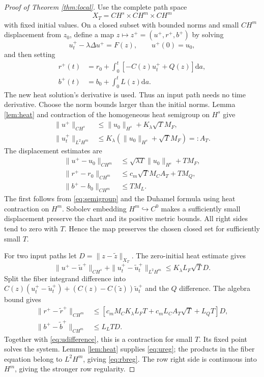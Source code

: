 \documentclass[11pt]{article}
\newcommand{\dd}{\mathrm d}
\begin{document}
\begin{proof}[Proof of Theorem \ref{thm:local}]
Use the complete path space
\begin{equation}
 X_T=CH^s\times CH^m\times CH^m
\end{equation}
with fixed initial values. On a closed subset with bounded norms and small $CH^m$ displacement from $z_0$, define a map $z\mapsto z^+=(u^+,r^+,b^+)$ by solving
\begin{equation}
 u_t^+-\lambda\Delta u^+=F(z),\qquad u^+(0)=u_0,
\end{equation}
and then setting
\begin{align}
 r^+(t)&=r_0+\int_0^t[-C(z)u_t^++Q(z)]\dd a,\\
 b^+(t)&=b_0+\int_0^tL(z)\dd a.
 \label{eq:picard}
\end{align}
The new heat solution's derivative is used. Thus an input path needs no time derivative. Choose the norm bounds larger than the initial norms. Lemma \ref{lem:heat} and contraction of the homogeneous heat semigroup on $H^s$ give
\begin{align}
 \|u^+\|_{CH^s}&\leq\|u_0\|_{H^s}+K_\lambda\sqrt T M_F,\\
 \|u_t^+\|_{L^2H^m}&\leq
 K_\lambda(\|u_0\|_{H^s}+\sqrt T M_F)=:A_T.
 \label{eq:A}
\end{align}
The displacement estimates are
\begin{align}
 \|u^+-u_0\|_{CH^m}&\leq
           \sqrt{\lambda T}\|u_0\|_{H^s}+TM_F,\label{eq:preserve-u}\\
 \|r^+-r_0\|_{CH^m}&\leq c_m\sqrt T M_C A_T+TM_Q,\\
 \|b^+-b_0\|_{CH^m}&\leq TM_L.
 \label{eq:preserve}
\end{align}
The first follows from \eqref{eq:semigroup} and the Duhamel formula using heat contraction on $H^m$. Sobolev embedding $H^m\hookrightarrow C^0$ makes a sufficiently small displacement preserve the chart and its positive metric bounds. All right sides tend to zero with $T$. Hence the map preserves the chosen closed set for sufficiently small $T$.

For two input paths let $D=\|z-\widetilde z\|_{X_T}$. The zero-initial heat estimate gives
\begin{equation}
 \|u^+-\widetilde u^+\|_{CH^s}
 +\|u_t^+-\widetilde u_t^+\|_{L^2H^m}
 \leq K_\lambda L_F\sqrt T D.
 \label{eq:udifference}
\end{equation}
Split the fiber integrand difference into
$C(z)(u_t^+-\widetilde u_t^+)
 +(C(z)-C(\widetilde z))\widetilde u_t^+$
and the $Q$ difference. The algebra bound gives
\begin{align}
 \|r^+-\widetilde r^+\|_{CH^m}
 &\leq[c_m M_CK_\lambda L_F T+c_mL_C A_T\sqrt T+L_QT]D,\\
 \|b^+-\widetilde b^+\|_{CH^m}&\leq L_LT D.
 \label{eq:rbdifference}
\end{align}
Together with \eqref{eq:udifference}, this is a contraction for small $T$. Its fixed point solves the system. Lemma \ref{lem:heat} supplies \eqref{eq:ureg}; the products in the fiber equation belong to $L^2H^m$, giving \eqref{eq:rbreg}. The row right side is continuous into $H^m$, giving the stronger row regularity.


\end{proof}
\end{document}
